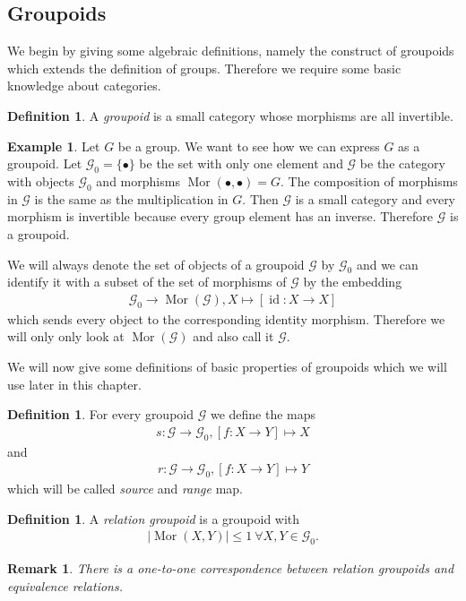 \documentclass[12pt,a4paper]{scrartcl}
\theoremstyle{plain}
\newtheorem{Remark}[Theorem]{Remark}
\theoremstyle{definition}
\newtheorem{Definition}[Theorem]{Definition}
\newtheorem{Example}[Theorem]{Example}
\numberwithin{equation}{section}
\newcommand{\2}{\mathbb{Z} / 2 \mathbb{Z}}
\newcommand{\G}{\mathcal{G}}
\newcommand{\1}{\bar{1}}
\newcommand{\0}{\bar{0}}
\newcommand{\id}{\operatorname{id}}
\newcommand{\Mor}{\operatorname{Mor}}
\begin{document}
\subsection{Groupoids}
We begin by giving some algebraic definitions, namely the construct of groupoids which extends the definition of groups. Therefore we require some basic knowledge about categories. 
\begin{Definition}
	A \emph{groupoid} is a small category whose morphisms are all invertible.
\end{Definition}
\begin{Example} \label{group}
	Let $G$ be a group. We want to see how we can express $G$ as a groupoid. Let $\mathcal{G}_0 = \{\bullet\}$ be the set with only one element  and $\mathcal{G}$ be the category with objects $\G_0$ and morphisms $\Mor(\bullet, \bullet) = G$. The composition of morphisms in $\mathcal{G}$ is the same as the multiplication in $G$. Then $\mathcal{G}$ is a small category and every morphism is invertible because every group element has an inverse. Therefore $\mathcal{G}$ is a groupoid.
\end{Example}
We will always denote the set of objects of a groupoid $\mathcal{G}$ by $\mathcal{G}_0$ and we can identify it with a subset of the set of morphisms of $\mathcal{G}$ by the embedding 
\begin{align*}
	\mathcal{G}_0 \to \Mor(\mathcal{G}), X \mapsto [\id\colon X \to X]
\end{align*}
which sends every object to the corresponding identity morphism. Therefore we will only only look at $\Mor(\mathcal{G})$ and also call it $\mathcal{G}$. 

We will now give some definitions of basic properties of groupoids which we will use later in this chapter.

\begin{Definition}
	For every groupoid $\mathcal{G}$ we define the maps
	\begin{align*}
		s\colon \mathcal{G} \to \mathcal{G}_0, [f\colon X \to Y] \mapsto X
	\end{align*}
	and
	\begin{align*}
		r\colon\mathcal{G} \to \mathcal{G}_0, [f\colon X \to Y] \mapsto Y
	\end{align*}
	which will be called \emph{source} and \emph{range} map.
\end{Definition}
\begin{Definition}
	A \emph{relation groupoid} is a groupoid with 
	\begin{align*}
		|\Mor(X, Y)| \leq 1 \ \forall X,Y \in \G_0.
	\end{align*}
\end{Definition}
\begin{Remark}
	There is a one-to-one correspondence between relation groupoids and equivalence relations.
\end{Remark}
\end{document}
